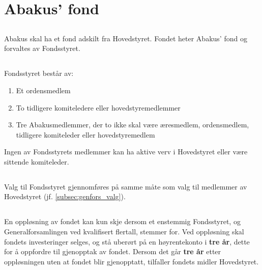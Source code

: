 \section{Abakus' fond}

\subsection{}
Abakus skal ha et fond adskilt fra Hovedstyret. Fondet heter Abakus’ fond og
forvaltes av Fondsstyret.

\subsection{}
Fondsstyret består av:
\begin{enumerate}[label=\alph*)]
    \item Et ordensmedlem
    \item To tidligere komiteledere eller hovedstyremedlemmer
    \item Tre Abakusmedlemmer, der to ikke skal være æresmedlem, ordensmedlem, tidligere komiteleder eller hovedstyremedlem
\end{enumerate}
Ingen av Fondsstyrets medlemmer kan ha aktive verv i Hovedstyret eller være sittende komiteleder. 

\subsection{}
Valg til Fondsstyret gjennomføres på samme måte som valg til medlemmer av Hovedstyret (jf. \ref{subsec:genfors_valg}).

\subsection{}
En oppløsning av fondet kan kun skje dersom et enstemmig Fondsstyret, og Generalforsamlingen ved kvalifisert flertall, 
stemmer for. Ved oppløsning skal fondets investeringer selges, og stå uberørt på en høyrentekonto i \textbf{tre år}, dette for å
oppfordre til gjenopptak av fondet. Dersom det går \textbf{tre år} etter oppløsningen uten at fondet blir gjenopptatt, 
tilfaller fondets midler Hovedstyret.


